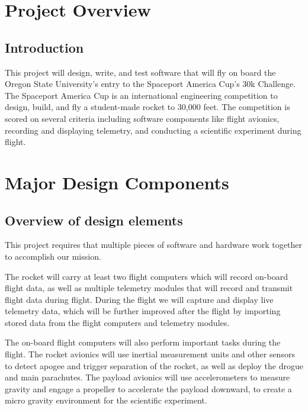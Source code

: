 \documentclass[onecolumn, draftclsnofoot, 10pt, compsoc]{IEEEtran}
\begin{document}

\tableofcontents


\section{Project Overview}
\subsection{Introduction}
This project will design, write, and test software that will fly on board the Oregon State University's entry to the Spaceport America Cup's 30k Challenge.  The Spaceport America Cup is an international engineering competition to design, build, and fly a student-made rocket to 30,000 feet.  The competition is scored on several criteria including software components like flight avionics, recording and displaying telemetry, and conducting a scientific experiment during flight.


\section{Major Design Components}

\subsection{Overview of design elements}

This project requires that multiple pieces of software and hardware work together to accomplish our mission.

The rocket will carry at least two flight computers which will record on-board flight data, as well as multiple telemetry modules that will record and transmit flight data during flight.  During the flight we will capture and display live telemetry data, which will be further improved after the flight by importing stored data from the flight computers and telemetry modules.

The on-board flight computers will also perform important tasks during the flight.  The rocket avionics will use inertial measurement units and other sensors to detect apogee and trigger separation of the rocket, as well as deploy the drogue and main parachutes.  The payload avionics will use accelerometers to measure gravity and engage a propeller to accelerate the payload downward, to create a micro gravity environment for the scientific experiment.
\end{document}
